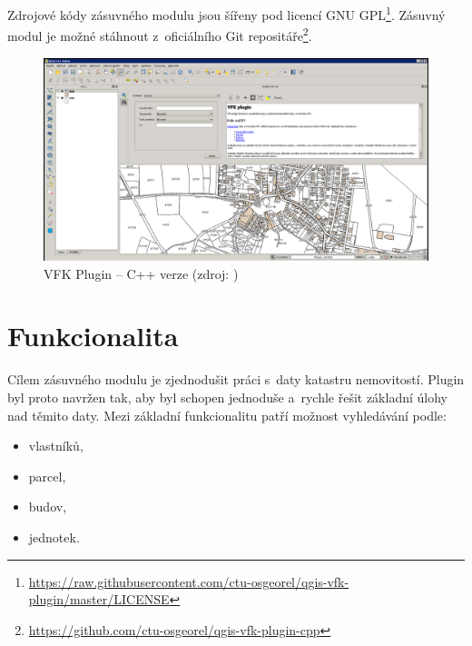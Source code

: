 \documentclass[a4paper,12pt,oneside]{book}
\begin{document}
Zdrojové kódy zásuvného modulu jsou šířeny pod licencí GNU
GPL\footnote{\url{https://raw.githubusercontent.com/ctu-osgeorel/qgis-vfk-plugin/master/LICENSE}}. Zásuvný
modul je možné stáhnout z~oficiálního Git
repositáře\footnote{\url{https://github.com/ctu-osgeorel/qgis-vfk-plugin-cpp}}. \cite{cvut_vfkPlugin}

\begin{figure}[htb]
\centering
\includegraphics[width=\textwidth]{images/vfkPlugin-puvodni_okno.png}
\caption[VFK Plugin -- C++ verze]{VFK Plugin -- C++ verze (zdroj: \cite{cvut_vfkPlugin})}
\end{figure}

\newpage
\section{Funkcionalita}
Cílem zásuvného modulu je zjednodušit práci s~daty katastru
nemovitostí. Plugin byl proto navržen tak, aby byl schopen jednoduše
a~rychle řešit základní úlohy nad těmito daty. Mezi základní
funkcionalitu patří možnost vyhledávání podle:

\begin{itemize}
 \item vlastníků,
 \item parcel,
 \item budov,
 \item jednotek.
\end{itemize}
\end{document}
